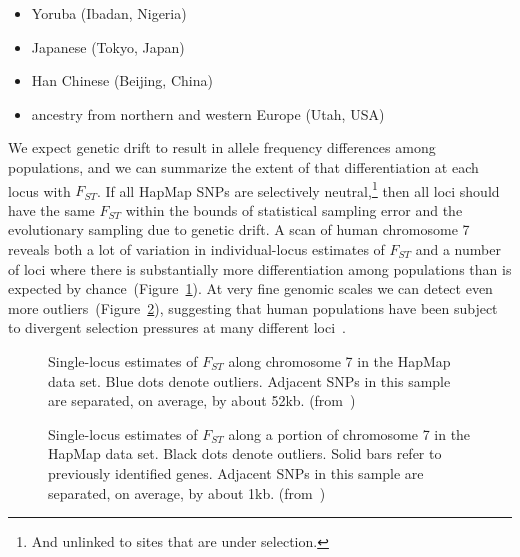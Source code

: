 \documentclass[12pt]{article}
\begin{document}
\begin{itemize}

\item Yoruba (Ibadan, Nigeria)

\item Japanese (Tokyo, Japan)

\item Han Chinese (Beijing, China)

\item ancestry from northern and western Europe (Utah, USA)

\end{itemize}

We expect genetic drift to result in allele frequency differences
among populations, and we can summarize the extent of that
differentiation at each locus with $F_{ST}$. If all HapMap SNPs are
selectively neutral,\footnote{And unlinked to sites that are under
  selection.} then all loci should have the same $F_{ST}$ within the
bounds of statistical sampling error and the evolutionary sampling due
to genetic drift. A scan of human chromosome 7 reveals both a lot of
variation in individual-locus estimates of $F_{ST}$ and a number of
loci where there is substantially more differentiation among
populations than is expected by
chance~(Figure~\ref{fig:low-res-SNP}). At very fine genomic scales we
can detect even more outliers~(Figure~\ref{fig:high-res-SNP}),
suggesting that human populations have been subject to divergent
selection pressures at many different loci~\cite{Guo-etal-2009}.

\begin{figure}
\begin{center}
\end{center}
\caption{Single-locus estimates of $F_{ST}$ along chromosome 7 in the
  HapMap data set. Blue dots denote outliers. Adjacent SNPs in this
  sample are separated, on average, by about
  52kb. (from~\cite{Guo-etal-2009})}\label{fig:low-res-SNP}
\end{figure}

\begin{figure}
\begin{center}
\end{center}
\caption{Single-locus estimates of $F_{ST}$ along a portion of
  chromosome 7 in the HapMap data set. Black dots denote
  outliers. Solid bars refer to previously identified genes. Adjacent
  SNPs in this sample are separated, on average, by about
  1kb. (from~\cite{Guo-etal-2009})}\label{fig:high-res-SNP}
\end{figure}
\end{document}
